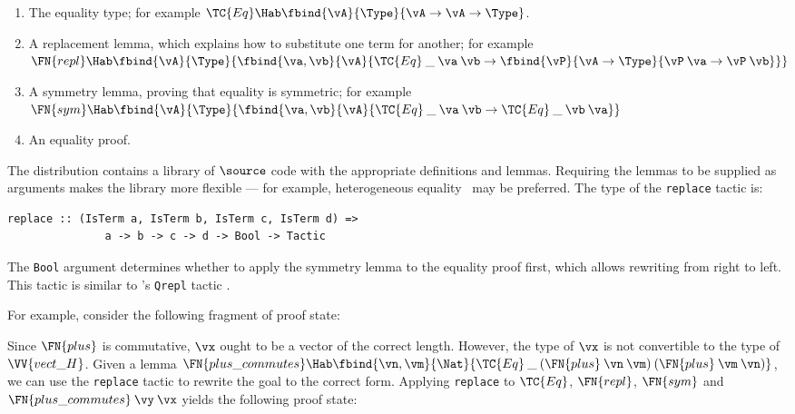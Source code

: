\begin{enumerate}
\item The equality type; for example
  $\TC{Eq}\Hab\fbind{\vA}{\Type}{\vA\to\vA\to\Type}$.
\item A replacement lemma, which explains how to substitute one term
  for another; for example\\
  $\FN{repl}\Hab\fbind{\vA}{\Type}{
    \fbind{\va,\vb}{\vA}{
	\TC{Eq}\:\_\:\va\:\vb\to\fbind{\vP}{\vA\to\Type}{
	  \vP\:\va\to\vP\:\vb}}}$
\item A symmetry lemma, proving that equality is symmetric; for
  example\\
  $\FN{sym}\Hab\fbind{\vA}{\Type}{
      \fbind{\va,\vb}{\vA}{\TC{Eq}\:\_\:\va\:\vb\to\TC{Eq}\:\_\:\vb\:\va}}$
\item An equality proof.
\end{enumerate}

The \Ivor{} distribution contains a library of $\source$ code with the
appropriate definitions and lemmas. Requiring the lemmas to be
supplied as arguments makes the library more flexible --- for example,
heterogeneous equality~\cite{mcbride-thesis} may be preferred.  The
type of the \texttt{replace} tactic is:

\begin{verbatim}
replace :: (IsTerm a, IsTerm b, IsTerm c, IsTerm d) =>
               a -> b -> c -> d -> Bool -> Tactic
\end{verbatim}

The \texttt{Bool} argument determines whether to apply the symmetry
lemma to the equality proof first, which allows rewriting from right
to left.
This  tactic is
similar to \Lego{}'s \texttt{Qrepl} tactic \cite{lego-manual}.

For example, consider the following fragment of proof state:


Since $\FN{plus}$ is commutative, $\vx$ ought to be a vector of the
correct length. However, the type of $\vx$ is not convertible to the
type of $\VV{vect\_H}$. Given a lemma $\FN{plus\_commutes}\Hab
\fbind{\vn,\vm}{\Nat}{\TC{Eq}\:\_\:(\FN{plus}\:\vn\:\vm)\:(\FN{plus}\:\vm\:\vn)}$,
we can use the \texttt{replace} tactic to rewrite the goal to the
correct form. Applying \texttt{replace} to $\TC{Eq}$, $\FN{repl}$,
$\FN{sym}$ and $\FN{plus\_commutes}\:\vy\:\vx$ yields the following
proof state:

